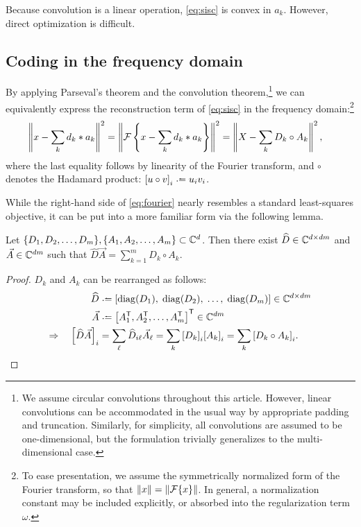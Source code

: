 \documentclass{article} %
\begin{document}
Because convolution is a linear operation, \eqref{eq:sisc} is convex in $a_k$.  
However, direct optimization is difficult.

\subsection{Coding in the frequency domain}
By applying Parseval's theorem and the convolution theorem,\footnote{We assume circular
convolutions throughout this article. However, linear convolutions can be accommodated
in the usual way by appropriate padding and truncation. Similarly, for simplicity, all 
convolutions are assumed to be one-dimensional, but the formulation trivially
generalizes to the multi-dimensional case.} we can equivalently express the 
reconstruction term of \eqref{eq:sisc} in the frequency domain:\footnote{To ease
presentation, we assume the symmetrically normalized form of the Fourier transform, 
so that $\|x\| = \|\mathcal{F}\{x\}\|$. In general, a normalization constant may be included
explicitly, or absorbed into the regularization term $\omega$.}
\begin{align}
\left\|x - \sum_k d_k * a_k\right\|^2 &= \left\|\mathcal{F}\left\{x - \sum_k d_k *
a_k\right\}\right\|^2
= \left\| X - \sum_k D_k \circ A_k\right\|^2,\label{eq:fourier}
\end{align}
where the last equality follows by linearity of the Fourier transform, and $\circ$
denotes the Hadamard product: ${[u\circ v]}_i \defeq u_i v_i$.

While the right-hand side of \eqref{eq:fourier} nearly resembles a standard
least-squares objective, it can be put into a more familiar form via the following
lemma.
\begin{lemma}
Let $\{D_1, D_2, \dots, D_m\}, \{A_1, A_2, \dots, A_m\} \subset \mathbb{C}^d$.  
Then there exist ${\widehat{D} \in \mathbb{C}^{d\times dm}}$ and ${\vec{A} \in \mathbb{C}^{dm}}$ such that 
${\widehat{D}\vec{A} = \sum_{k=1}^m D_k \circ A_k}$.\label{lemma:hadamard}
\end{lemma}
\begin{proof}
$D_k$ and $A_k$ can be rearranged as follows:
\begin{align*}
\widehat{D} &\defeq \left[\diag(D_1),\; \diag(D_2),\; \dots,\; \diag(D_m)\right] \in \C^{d\times dm}\\
\vec{A} &\defeq \left[A_1\trans, A_2\trans, \dots,
A_m\trans\right]\trans \in \C^{dm}\\
\Rightarrow \quad {\left[\widehat{D}\vec{A}\right]}_i &= \sum_\ell \widehat{D}_{i\ell}
\vec{A}_\ell = \sum_k {[D_k]}_i {[A_k]}_i = \sum_k
{[D_k \circ A_k]}_i.
\end{align*}
\end{proof}
\end{document}
